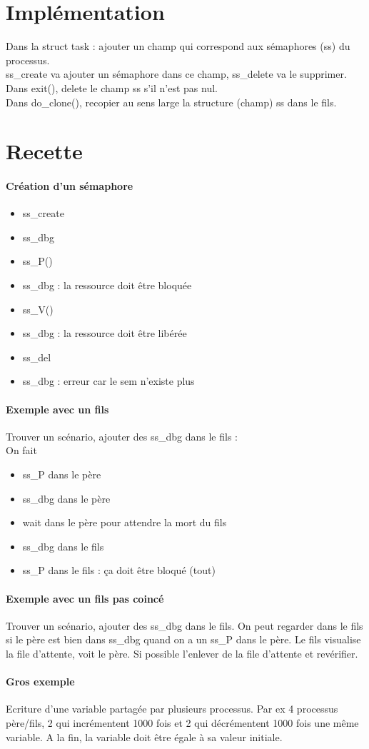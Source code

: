 \documentclass[12pt]{article}
\begin{document}
\newpage
\section{Implémentation}
Dans la struct task : ajouter un champ qui correspond aux sémaphores (ss) du processus. \\
ss_create va ajouter un sémaphore dans ce champ, ss_delete va le supprimer. \\
Dans exit(), delete le champ ss s'il n'est pas nul. \\
Dans do_clone(), recopier au sens large la structure (champ) ss dans le fils.

\newpage
\section{Recette}
\paragraph{Création d'un sémaphore}
\begin{itemize}
  \item ss_create
  \item ss_dbg
  \item ss_P()
  \item ss_dbg : la ressource doit être bloquée
  \item ss_V()
  \item ss_dbg : la ressource doit être libérée
  \item ss_del
  \item ss_dbg : erreur car le sem n'existe plus
\end{itemize}

\paragraph{Exemple avec un fils}
Trouver un scénario, ajouter des ss_dbg dans le fils : \\
On fait
\begin{itemize}
  \item ss_P dans le père
  \item ss_dbg dans le père
  \item wait dans le père pour attendre la mort du fils
  \item ss_dbg dans le fils
  \item ss_P dans le fils : ça doit être bloqué (tout)
\end{itemize}

\paragraph{Exemple avec un fils pas coincé}
Trouver un scénario, ajouter des ss_dbg dans le fils. On peut regarder dans le fils si le père est bien dans ss_dbg quand on a un ss_P dans le père. Le fils visualise la file d'attente, voit le père. Si possible l'enlever de la file d'attente et revérifier.

\paragraph{Gros exemple}
Ecriture d'une variable partagée par plusieurs processus. Par ex 4 processus père/fils, 2 qui incrémentent 1000 fois et 2 qui décrémentent 1000 fois une même variable. A la fin, la variable doit être égale à sa valeur initiale.
\end{document}
